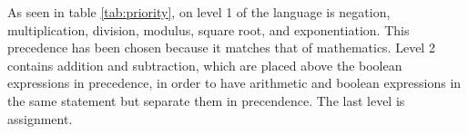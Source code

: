 As seen in table \ref{tab:priority}, on level 1 of the language is negation, multiplication, division, modulus, square root, and exponentiation. This precedence has been chosen because it matches that of mathematics. Level 2 contains addition and subtraction, which are placed above the boolean expressions in precedence, in order to have arithmetic and boolean expressions in the same statement but separate them in precendence. The last level is assignment.

